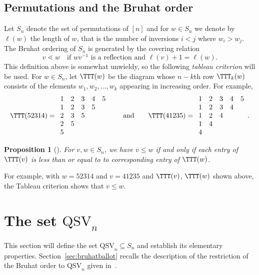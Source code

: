 \documentclass[12pt]{amsart}
\newtheorem{prop}[equation]{Proposition}
\theoremstyle{definition}
\theoremstyle{remark}
\numberwithin{equation}{section}
\newcommand{\QSV}{\mathrm{QSV}}
\begin{document}
\subsection{Permutations and the Bruhat order}
\label{sec:bruhat}

Let $S_n$ denote the set of permutations of $[n]$ and for $w\in S_n$ we denote by $\ell(w)$ the length of $w$, that is the number of inversions $i<j$ where $w_i>w_j$.
The Bruhat ordering of $S_{n}$ is generated by the covering relation 
\[
v \lessdot w \quad\text{if $wv^{-1}$ is a reflection and $\ell(v) +1 = \ell(w)$}.
\]
This definition above is somewhat unwieldy, so the following \emph{tableau criterion} will be used.  For $w \in S_{n}$, let $\TTT(w)$ be the diagram whose $n-k$th row $\TTT_{k}(w)$ consists of the elements $w_{1}, w_{2}, \ldots, w_{k}$ appearing in increasing order.  For example,
\[
\TTT(52314) = 
\begin{array}{ccccc} 
1 & 2 & 3 & 4 & 5 \\ 
1 & 2 & 3 & 5 \\ 
2 & 3 & 5 \\ 
2 & 5 \\ 
5
\end{array}
\qquad\text{and}\qquad
\TTT(41235) = \begin{array}{ccccc} 
1 & 2 & 3 & 4 & 5 \\ 
1 & 2 & 3 & 4 \\ 
1 & 2 & 4 \\ 
1 & 4 \\ 
4
\end{array}.
\]

\begin{prop}[{\cite[Theorem 2.6.3]{BjornerBrenti}}]
\label{TableauCriterion}
For $v, w \in S_{n}$, we have $v \le w$  if and only if each entry of $\TTT(v)$ is less than or equal to to corresponding entry of $\TTT(w)$.
\end{prop}

For example, with $w = 52314$ and $v = 41235$ and $\TTT(v)$, $\TTT(w)$ shown above, the Tableau criterion shows that $v \le w$.

\section{The set $\QSV_{n}$}
\label{sec:QSV}

This section will define the set $\QSV_{n}\subseteq S_n$ and establish its elementary properties.  Section~\ref{sec:bruhatballot} recalls the description of the restriction of the Bruhat order to $\QSV_{n}$ given in~\cite{GobetWilliams}.
\end{document}
